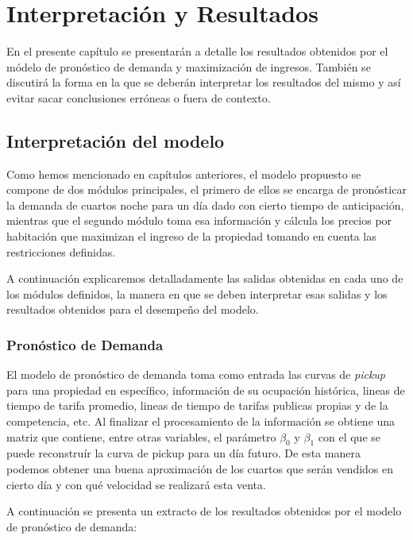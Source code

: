\chapter{Interpretación y Resultados}
\label{ch:results}

En el presente capítulo se presentarán a detalle los resultados obtenidos por el módelo de pronóstico de demanda y maximización de ingresos. También se discutirá la forma en la que se deberán interpretar los resultados del mismo y así evitar sacar conclusiones erróneas o fuera de contexto.

\section*{Interpretación del modelo}

Como hemos mencionado en capítulos anteriores, el modelo propuesto se compone de dos módulos principales, el primero de ellos se encarga de pronósticar la demanda de cuartos noche para un día dado con cierto tiempo de anticipación, mientras que el segundo módulo toma esa información y cálcula los precios por habitación que maximizan el ingreso de la propiedad tomando en cuenta las restricciones definidas.

A continuación explicaremos detalladamente las salidas obtenidas en cada uno de los módulos definidos, la manera en que se deben interpretar esas salidas y los resultados obtenidos para el desempeño del modelo.

\subsection*{Pronóstico de Demanda}

El modelo de pronóstico de demanda toma como entrada las curvas de \emph{pickup} para una propiedad en específico, información de su ocupación histórica, lineas de tiempo de tarifa promedio, lineas de tiempo de tarifas publicas propias y de la competencia, etc. Al finalizar el procesamiento de la información se obtiene una matriz que contiene, entre otras variables, el parámetro $\beta_0$ y $\beta_1$ con el que se puede reconstruír la curva de pickup para un día futuro. De esta manera podemos obtener una buena aproximación de los cuartos que serán vendidos en cierto día y con qué velocidad se realizará esta venta.

A continuación se presenta un extracto de los resultados obtenidos por el modelo de pronóstico de demanda:

